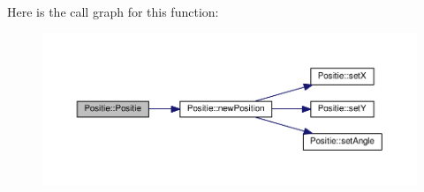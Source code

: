 Here is the call graph for this function\-:
\nopagebreak
\begin{figure}[H]
\begin{center}
\leavevmode
\includegraphics[width=350pt]{classPositie_a32e5283bffdcfe28b28a27d0b2d04181_cgraph}
\end{center}
\end{figure}




